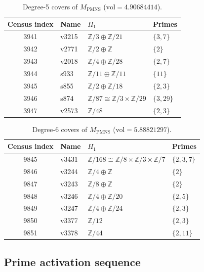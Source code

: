\documentclass[12pt]{article}
\theoremstyle{definition}
\begin{document}
\begin{table}[htbp]
\centering
\caption{Degree-5 covers of $M_{\mathrm{PMNS}}$
  ($\mathrm{vol} = 4.90684414$).}
\label{tab:deg5}
\begin{tabular}{clll}
\toprule
Census index & Name & $H_1$ & Primes \\
\midrule
3941 & v3215 & $\mathbb{Z}/3 \oplus \mathbb{Z}/21$
     & $\{3,7\}$ \\
3942 & v2771 & $\mathbb{Z}/2 \oplus \mathbb{Z}$
     & $\{2\}$ \\
3943 & v2018 & $\mathbb{Z}/4 \oplus \mathbb{Z}/28$
     & $\{2,7\}$ \\
3944 & s933  & $\mathbb{Z}/11 \oplus \mathbb{Z}/11$
     & $\{11\}$ \\
3945 & s855  & $\mathbb{Z}/2 \oplus \mathbb{Z}/18$
     & $\{2,3\}$ \\
3946 & s874  & $\mathbb{Z}/87 \cong \mathbb{Z}/3 \times \mathbb{Z}/29$
     & $\{3,29\}$ \\
3947 & v2573 & $\mathbb{Z}/48$
     & $\{2,3\}$ \\
\bottomrule
\end{tabular}
\end{table}

\begin{table}[htbp]
\centering
\caption{Degree-6 covers of $M_{\mathrm{PMNS}}$
  ($\mathrm{vol} = 5.88821297$).}
\label{tab:deg6}
\begin{tabular}{clll}
\toprule
Census index & Name & $H_1$ & Primes \\
\midrule
9845 & v3431
     & $\mathbb{Z}/168 \cong \mathbb{Z}/8 \times \mathbb{Z}/3
        \times \mathbb{Z}/7$
     & $\{2,3,7\}$ \\
9846 & v3244 & $\mathbb{Z}/4 \oplus \mathbb{Z}$  & $\{2\}$ \\
9847 & v3243 & $\mathbb{Z}/8 \oplus \mathbb{Z}$  & $\{2\}$ \\
9848 & v3246 & $\mathbb{Z}/4 \oplus \mathbb{Z}/20$ & $\{2,5\}$ \\
9849 & v3247 & $\mathbb{Z}/4 \oplus \mathbb{Z}/24$ & $\{2,3\}$ \\
9850 & v3377 & $\mathbb{Z}/12$ & $\{2,3\}$ \\
9851 & v3378 & $\mathbb{Z}/44$ & $\{2,11\}$ \\
\bottomrule
\end{tabular}
\end{table}

\subsection{Prime activation sequence}
\end{document}
